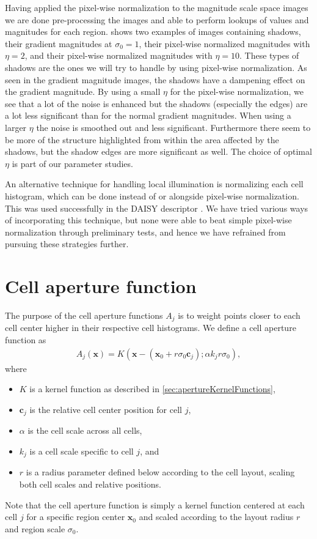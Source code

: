 \documentclass[thesis.tex]{subfiles}
\def\x{\mathbf{x}}
\def\c{\mathbf{c}}
\begin{document}
Having applied the pixel-wise normalization to the magnitude scale space images we are done pre-processing the images and able to perform lookups of values and magnitudes for each region.
 shows two examples of images containing shadows, their gradient magnitudes at $\sigma_0 = 1$, their pixel-wise normalized magnitudes with $\eta = 2$, and their pixel-wise normalized magnitudes with $\eta = 10$. These types of shadows are the ones we will try to handle by using pixel-wise normalization. As seen in the gradient magnitude images, the shadows have a dampening effect on the gradient magnitude. By using a small $\eta$ for the pixel-wise normalization, we see that a lot of the noise is enhanced but the shadows (especially the edges) are a lot less significant than for the normal gradient magnitudes. When using a larger $\eta$ the noise is smoothed out and less significant. Furthermore there seem to be more of the structure highlighted from within the area affected by the shadows, but the shadow edges are more significant as well. The choice of optimal $\eta$ is part of our parameter studies.

An alternative technique for handling local illumination is normalizing each cell histogram, which can be done instead of or alongside pixel-wise normalization. This was used successfully in the DAISY descriptor \cite{tola2008fast}. We have tried various ways of incorporating this technique, but none were able to beat simple pixel-wise normalization through preliminary tests, and hence we have refrained from pursuing these strategies further.

\section{Cell aperture function}
\label{sec:cellApertureFunction}
%
The purpose of the cell aperture functions $A_j$ is to weight points closer to each cell center higher in their respective cell histograms. We define a cell aperture function as
%
\begin{align}
A_j(\x) = K(\x - (\x_0 + r \sigma_0 \c_j); \alpha k_j r \sigma_0),
\end{align}
%
where
%
\begin{itemize}
\item[] $K$ is a kernel function as described in \ref{sec:apertureKernelFunctions},
\item[] $\c_j$ is the relative cell center position for cell $j$,
\item[] $\alpha$ is the cell scale across all cells,
\item[] $k_j$ is a cell scale specific to cell $j$, and
\item[] $r$ is a radius parameter defined below according to the cell layout, scaling both cell scales and relative positions.
\end{itemize}
%
Note that the cell aperture function is simply a kernel function centered at each cell $j$ for a specific region center $\x_0$ and scaled according to the layout radius $r$ and region scale $\sigma_0$.
\end{document}
